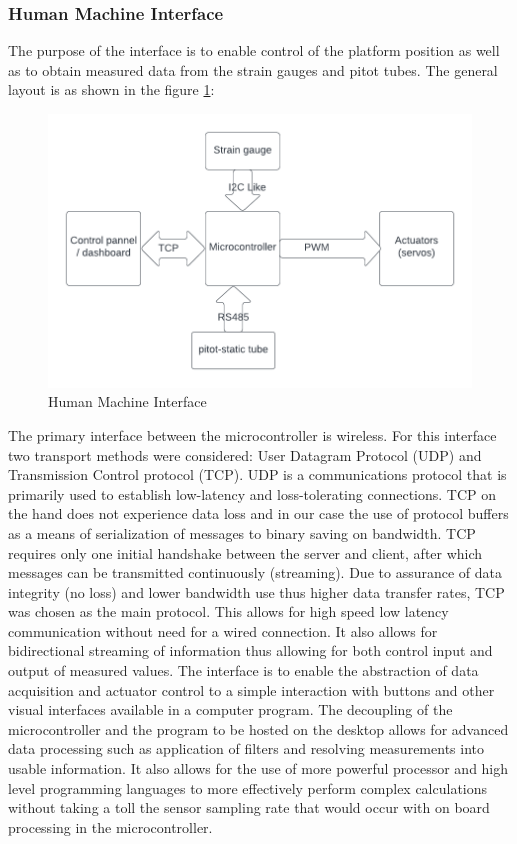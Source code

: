 \subsubsection{Human Machine Interface}
The purpose of the interface is to enable control of the platform position as well as to obtain measured data from the strain gauges and pitot tubes.
The general layout is as shown in the figure \ref{fig:hmi}:
\begin{center}
	\begin{figure}[H]
		\centering
		\includegraphics{Figures/Interface}
		\caption[Human Machine Interface]{Human Machine Interface}
		\label{fig:hmi}
	\end{figure}
\end{center}

The primary interface between the microcontroller is wireless.
For this interface two transport methods were considered: User Datagram Protocol (UDP) and Transmission Control protocol (TCP).
UDP is a communications protocol that is primarily used to establish low-latency and loss-tolerating connections.
TCP on the hand does not experience data loss and in our case the use of protocol buffers as a means of serialization of messages to binary saving on bandwidth.
TCP requires only one initial handshake between the server and client, after which messages can be transmitted continuously (streaming).
Due to assurance of data integrity (no loss) and lower bandwidth use thus higher data transfer rates, TCP was chosen as the main protocol.
This allows for high speed low latency communication without need for a wired connection. It also allows for bidirectional streaming of information thus allowing for both control input and output of measured values. The interface is to enable the abstraction of data acquisition and actuator control to a simple interaction with buttons and other visual interfaces available in a computer program.
The decoupling of the microcontroller and the program to be hosted on the desktop allows for advanced data processing such as application of filters and resolving measurements into usable information. It also allows for the use of more powerful processor and high level programming languages to more effectively perform complex calculations without taking a toll the sensor sampling rate that would occur with on board processing in the microcontroller.

